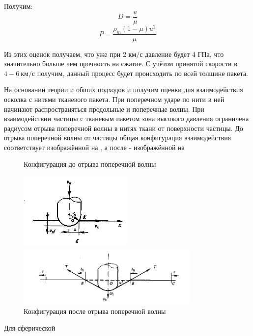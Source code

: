 Получим:
\begin{equation}
    D = \frac{u}{\mu}
\end{equation}
\begin{equation}
    P = \frac{\rho_m (1 - \mu) u ^2}{\mu}
\end{equation}

Из этих оценок получаем, что уже при 2 $км/с$ давление будет 4 ГПа, что значительно больше чем прочность на сжатие.
С учётом принятой скорости в $4-6~км/с$ получим, данный процесс будет происходить по всей толщине пакета.

На основании теории\cite{rakhmatulin} и обших подходов и\cite{kobylkin2014} получим оценки для взаимодействия
осколка с нитями тканевого пакета.
При поперечном ударе по нити в ней начинают распространяться продольные и поперечные волны.
При взаимодействии частицы с тканевым пакетом зона высокого давления ограничена радиусом отрыва поперечной волны
в нитях ткани от поверхности частицы.
До отрыва поперечной волны от частицы общая конфигурация взаимодействия соответствует изображённой на
, а после - изображённой на 

\begin{figure}[H]
    \centering

    \caption{Конфигурация до отрыва поперечной волны}
    \label{fig:first-stage}
    \includegraphics[width=0.5\textwidth]{img/first_stage.png}

    \caption{Конфигурация после отрыва поперечной волны}
    \label{fig:second-stage}
    \includegraphics[width=0.8\textwidth]{img/second_stage.png}
\end{figure}

Для сферической